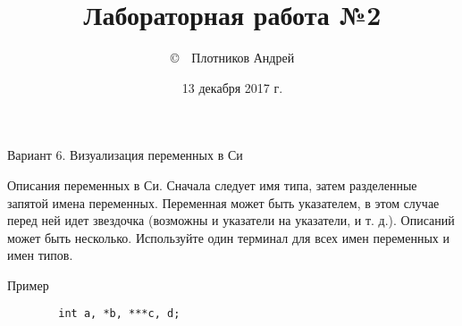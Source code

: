 \documentclass[12pt]{article}
\title{Лабораторная работа №2}
\author{\copyright~~Плотников Андрей}
\date{13 декабря 2017 г.}
\begin{document}
\maketitle
\thispagestyle{empty}
Вариант 6. Визуализация переменных в Си

Описания переменных в Си. Сначала следует имя типа, затем
разделенные  запятой  имена  переменных.  Переменная  может  быть
указателем, в этом случае перед ней идет звездочка (возможны и
указатели на указатели, и т. д.). Описаний может быть несколько.
Используйте один терминал для всех имен переменных и имен типов.

Пример

    \begin{verbatim}
        int a, *b, ***c, d;
    \end{verbatim}
\end{document}
